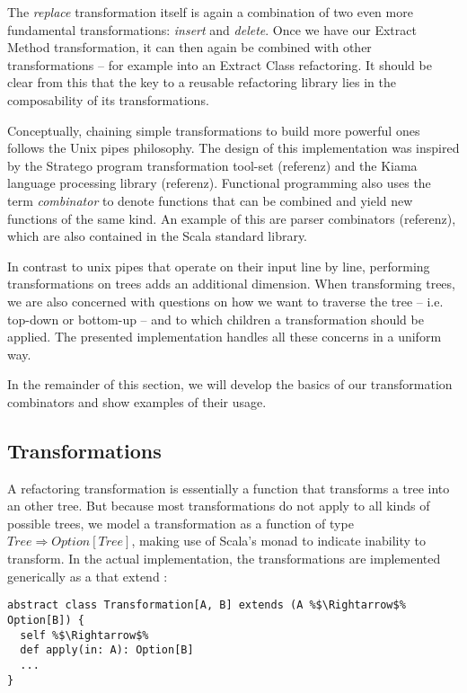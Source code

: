 \documentclass[10pt,a4paper,oneside]{scrreprt}
\begin{document}
The \textit{replace} transformation itself is again a combination of two even more fundamental transformations: \textit{insert} and \textit{delete}. Once we have our Extract Method transformation, it can then again be combined with other transformations -- for example into an Extract Class refactoring. It should be clear from this that the key to a reusable refactoring library lies in the composability of its transformations. 

Conceptually, chaining simple transformations to build more powerful ones follows the Unix pipes philosophy. The design of this implementation was inspired by the Stratego program transformation tool-set (referenz) and the Kiama language processing library (referenz). Functional programming also uses the term \textit{combinator} to denote functions that can be combined and yield new functions of the same kind. An example of this are parser combinators (referenz), which are also contained in the Scala standard library.

In contrast to unix pipes that operate on their input line by line, performing transformations on trees adds an additional dimension. When transforming trees, we are also concerned with questions on how we want to traverse the tree -- i.e. top-down or bottom-up -- and to which children a transformation should be applied. The presented implementation handles all these concerns in a uniform way.

In the remainder of this section, we will develop the basics of our transformation combinators and show examples of their usage.

\subsection{Transformations}

A refactoring transformation is essentially a function that transforms a tree into an other tree. But because most transformations do not apply to all kinds of possible trees, we model a transformation as a function of type $Tree\Rightarrow Option[Tree]$, making use of Scala's  monad to indicate inability to transform. In the actual implementation, the transformations are implemented generically as a  that extend :

\begin{lstlisting}
abstract class Transformation[A, B] extends (A %$\Rightarrow$% Option[B]) {
  self %$\Rightarrow$%
  def apply(in: A): Option[B]
  ...
}
\end{lstlisting}
\end{document}
